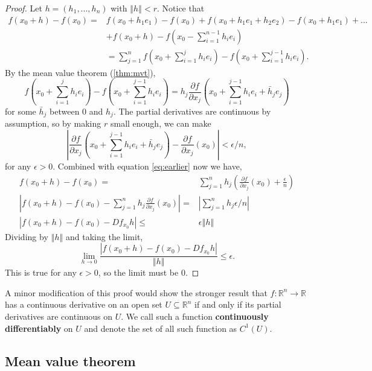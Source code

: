 \documentclass[12pt,reqno]{amsart}
\theoremstyle{definition}
\def\R{\mathbb{R}}
\newcommand{\norm}[1]{\left\Vert {#1} \right\Vert}
\renewcommand{\to}{{\rightarrow}}
\begin{document}
\begin{proof}
  Let $h = (h_1, ..., h_n)$ with $\norm{h}<r$. Notice that
  \begin{align} 
    f(x_0+h) - f(x_0) = & f(x_0 + h_1 e_1) - f(x_0) + f(x_0+h_1 e_1 +
    h_2 e_2) - f(x_0 + h_1 e_1) + ... \\
    & + f(x_0 + h) - f\left(x_0 -
    \sum_{i=1}^{n-1} h_i e_i\right) \\
    &  = \sum_{j=1}^n f\left(x_0 + \sum_{i=1}^j h_i e_i\right) -
    f\left(x_0 + \sum_{i=1}^{j-1} h_i e_i\right). \label{eq:earlier}
  \end{align}
  By the mean value theorem (\ref{thm:mvt}), 
  \[ f\left(x_0 + \sum_{i=1}^j h_i e_i\right) -
  f\left(x_0 + \sum_{i=1}^{j-1} h_i e_i\right) = h_j \frac{\partial f}
  {\partial x_j} (x_0 +  \sum_{i=1}^{j-1} h_i e_i + \bar{h}_je_j) \]
  for some $\bar{h}_j$ between $0$ and $h_j$.  The partial derivatives
  are continuous by assumption, so by making $r$ small enough, we can
  make  
  \[\left| \frac{\partial f}
    {\partial x_j} (x_0 +  \sum_{i=1}^{j-1} h_i e_i + \bar{h}_je_j) -
    \frac{\partial f}{\partial x_j}(x_0) \right| < \epsilon /n, \]
  for any $\epsilon>0$. 
  Combined with equation \ref{eq:earlier} now we have,
  \begin{align} 
    f(x_0+h) - f(x_0) = & \sum_{j=1}^n  h_j \left(\frac{\partial f}{\partial
        x_j} (x_0) + \frac{\epsilon}{n}\right) \\
    \left| f(x_0+h) - f(x_0)  - \sum_{j=1}^n  h_j \frac{\partial f}{\partial
        x_j} (x_0) \right| = & \left| \sum_{j=1}^n h_j \epsilon/n \right|
    \\
    \left| f(x_0+h) - f(x_0)  - Df_{x_0} h \right| \leq & \epsilon
    \norm{h} 
  \end{align}
  Dividing by $\norm{h}$ and taking the limit, 
  \[ \lim_{h \to 0} \frac{\left| f(x_0+h) - f(x_0)  - Df_{x_0} h
    \right|}{\norm{h}} \leq \epsilon.
  \]
  This is true for any $\epsilon>0$, so the limit must be 0. 
\end{proof}
A minor modification of this proof would show the stronger result that
$f:\R^n \to \R$ has a continuous derivative on an open set $U
\subseteq \R^n$ if and only if its partial derivatives are continuous
on $U$. We call such a function \textbf{continuously differentiably}
on $U$ and denote the set of all such function as $C^1(U)$. 

\subsection{Mean value theorem}
\end{document}
